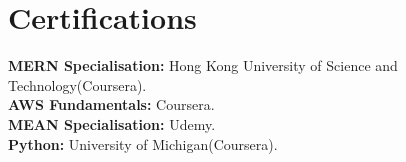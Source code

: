 \documentclass[letterpaper,11pt]{article}
\begin{document}
\section{Certifications}
 \begin{itemize}[leftmargin=0.15in, label={}]
    \small{\item{
     \textbf{MERN Specialisation:}{ Hong Kong University of Science and Technology(Coursera).} \\
     \textbf{AWS Fundamentals:}{ Coursera.} \\
     \textbf{MEAN Specialisation:}{ Udemy.} \\
     \textbf{Python:}{ University of Michigan(Coursera).} \\
    }}
 \end{itemize}


\end{document}
